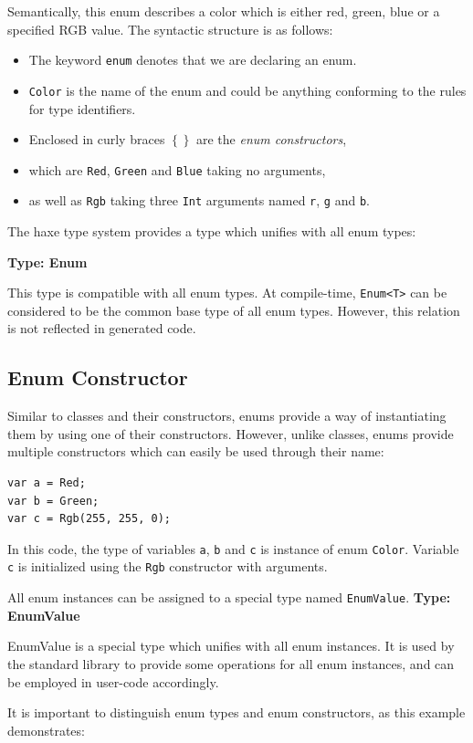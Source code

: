\documentclass[a4paper,oneside]{book}
\newcommand{\type}[1]{\texttt{#1}}
\newcommand{\expr}[1]{\texttt{#1}}
\newenvironment{myshaded}
  {\def\FrameCommand{\fboxsep=\topsep\colorbox{bgcolor}}%
  \MakeFramed {\advance\hsize-\width \FrameRestore}}%
 {\endMakeFramed}
\newcommand{\define}[3][Definition]
	{\begin{myshaded}\noindent\textbf{#1: #2}\par\nobreak\noindent\ignorespaces#3\label{def:#2}\end{myshaded}}
\newcommand{\haxe}[2][]{%
}
\begin{document}
\haxe{assets/Color.hx}
Semantically, this enum describes a color which is either red, green, blue or a specified RGB value. The syntactic structure is as follows:
\begin{itemize}
	\item The keyword \expr{enum} denotes that we are declaring an enum.
	\item \type{Color} is the name of the enum and could be anything conforming to the rules for type identifiers.
	\item Enclosed in curly braces \expr{$\left\{\right\}$} are the \emph{enum constructors},
	\item which are \expr{Red}, \expr{Green} and \expr{Blue} taking no arguments,
	\item as well as \expr{Rgb} taking three \type{Int} arguments named \expr{r}, \expr{g} and \expr{b}.
\end{itemize}
The haxe type system provides a type which unifies with all enum types:

\define[Type]{Enum}{This type is compatible with all enum types. At compile-time, \type{Enum<T>} can be considered to be the common base type of all enum types. However, this relation is not reflected in generated code.} 

\subsection{Enum Constructor}
\label{types-enum-constructor}

Similar to classes and their constructors, enums provide a way of instantiating them by using one of their constructors. However, unlike classes, enums provide multiple constructors which can easily be used through their name:

\begin{lstlisting}
var a = Red;
var b = Green;
var c = Rgb(255, 255, 0);
\end{lstlisting}
In this code, the type of variables \expr{a}, \expr{b} and \expr{c} is instance of enum \type{Color}. Variable \expr{c} is initialized using the \expr{Rgb} constructor with arguments.

All enum instances can be assigned to a special type named \type{EnumValue}.
\define[Type]{EnumValue}{EnumValue is a special type which unifies with all enum instances. It is used by the standard library to provide some operations for all enum instances, and can be employed in user-code accordingly.}

It is important to distinguish enum types and enum constructors, as this example demonstrates:
\end{document}
